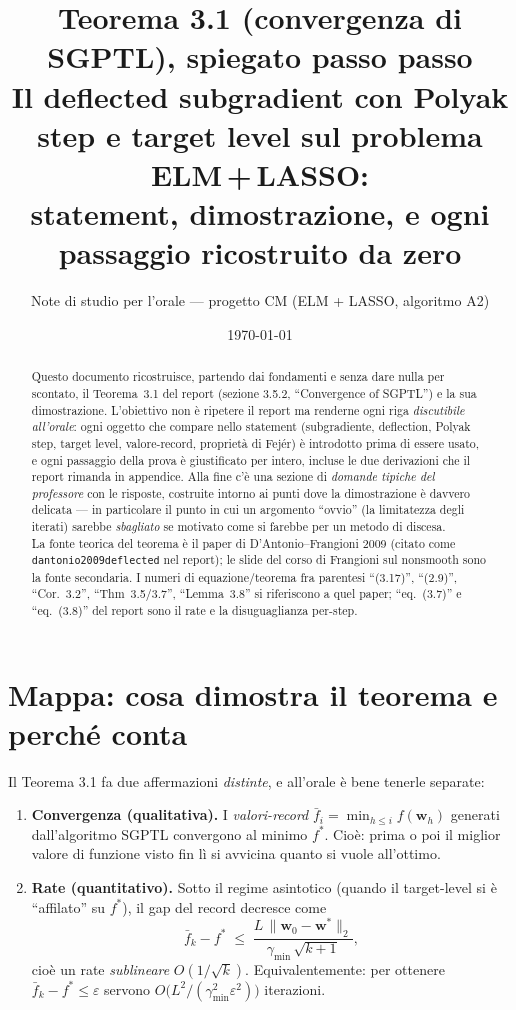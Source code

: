 \documentclass[11pt,a4paper]{article}
\title{\textbf{Teorema 3.1 (convergenza di SGPTL), spiegato passo passo}\\[4pt]
\large Il deflected subgradient con Polyak step e target level sul problema ELM\,+\,LASSO:\\
statement, dimostrazione, e ogni passaggio ricostruito da zero}
\author{Note di studio per l'orale --- progetto CM (ELM + LASSO, algoritmo A2)}
\date{\today}
\theoremstyle{definition}
\newcommand{\w}{\bm{w}}
\newcommand{\wstar}{\w^{*}}
\newcommand{\fstar}{f^{*}}
\newcommand{\fbar}{\bar{f}}
\newcommand{\gmin}{\gamma_{\min}}
\newcommand{\eps}{\varepsilon}
\newcommand{\norm}[1]{\lVert #1\rVert}
\begin{document}
\maketitle

\begin{abstract}
\noindent Questo documento ricostruisce, partendo dai fondamenti e senza dare nulla per
scontato, il Teorema~3.1 del report (sezione 3.5.2, ``Convergence of SGPTL'') e la sua
dimostrazione. L'obiettivo non è ripetere il report ma renderne ogni riga \emph{discutibile
all'orale}: ogni oggetto che compare nello statement (subgradiente, deflection, Polyak step,
target level, valore-record, proprietà di Fej\'er) è introdotto prima di essere usato, e ogni
passaggio della prova è giustificato per intero, incluse le due derivazioni che il report
rimanda in appendice. Alla fine c'è una sezione di \emph{domande tipiche del professore}
con le risposte, costruite intorno ai punti dove la dimostrazione è davvero delicata --- in
particolare il punto in cui un argomento ``ovvio'' (la limitatezza degli iterati) sarebbe
\emph{sbagliato} se motivato come si farebbe per un metodo di discesa.\\[4pt]
La fonte teorica del teorema è il paper di D'Antonio--Frangioni 2009 (citato come
\texttt{dantonio2009deflected} nel report); le slide del corso di Frangioni sul nonsmooth
sono la fonte secondaria. I numeri di equazione/teorema fra parentesi ``(3.17)'', ``(2.9)'',
``Cor.~3.2'', ``Thm~3.5/3.7'', ``Lemma~3.8'' si riferiscono a quel paper; ``eq.~(3.7)'' e
``eq.~(3.8)'' del report sono il rate e la disuguaglianza per-step.
\end{abstract}

\tableofcontents
\bigskip

\section{Mappa: cosa dimostra il teorema e perché conta}
\label{sec:mappa}

Il Teorema 3.1 fa due affermazioni \emph{distinte}, e all'orale è bene tenerle separate:

\begin{enumerate}[label=(\Roman*)]
\item \textbf{Convergenza (qualitativa).} I \emph{valori-record} $\fbar_i=\min_{h\le i}f(\w_h)$
generati dall'algoritmo SGPTL convergono al minimo $\fstar$. Cioè: prima o poi il miglior
valore di funzione visto fin lì si avvicina quanto si vuole all'ottimo.
\item \textbf{Rate (quantitativo).} Sotto il regime asintotico (quando il target-level si è
``affilato'' su $\fstar$), il gap del record decresce come
\[
\fbar_k-\fstar \;\le\; \frac{L\,\norm{\w_0-\wstar}_2}{\gmin\,\sqrt{k+1}},
\]
cioè un rate \emph{sublineare} $O(1/\sqrt{k})$. Equivalentemente: per ottenere
$\fbar_k-\fstar\le\eps$ servono $O\!\big(L^2/(\gmin^2\eps^2)\big)$ iterazioni.
\end{enumerate}
\end{document}
